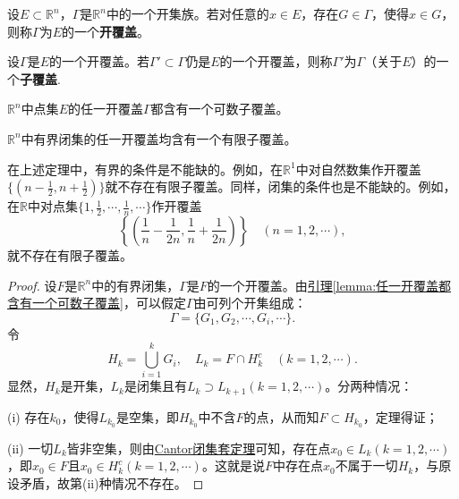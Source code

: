 \documentclass[../../main.tex]{subfiles}
\begin{document}
\begin{definition}[开覆盖]\label{definition:开覆盖}
设\(E\subset\mathbb{R}^n\)，\(\Gamma\)是\(\mathbb{R}^n\)中的一个开集族。若对任意的\(x\in E\)，存在\(G\in\Gamma\)，使得\(x\in G\)，则称\(\Gamma\)为\(E\)的一个\textbf{开覆盖}。

设\(\Gamma\)是\(E\)的一个开覆盖。若\(\Gamma'\subset\Gamma\)仍是\(E\)的一个开覆盖，则称\(\Gamma'\)为\(\Gamma\)（关于\(E\)）的一个\textbf{子覆盖}.
\end{definition}

\begin{lemma}\label{lemma:任一开覆盖都含有一个可数子覆盖}
  \(\mathbb{R}^n\)中点集\(E\)的任一开覆盖\(\Gamma\)都含有一个可数子覆盖。
\end{lemma}

\begin{theorem}\label{theorem:Heine - Borel有限子覆盖定理}
\(\mathbb{R}^n\)中有界闭集的任一开覆盖均含有一个有限子覆盖。
\end{theorem}
\begin{remark}
  在上述定理中，有界的条件是不能缺的。例如，在\(\mathbb{R}^1\)中对自然数集作开覆盖\(\{(n-\frac{1}{2},n+\frac{1}{2})\}\)就不存在有限子覆盖。同样，闭集的条件也是不能缺的。例如，在\(\mathbb{R}\)中对点集\(\{1,\frac{1}{2},\cdots,\frac{1}{n},\cdots\}\)作开覆盖
\[\left\{\left(\frac{1}{n}-\frac{1}{2n},\frac{1}{n}+\frac{1}{2n}\right)\right\}\quad(n = 1,2,\cdots),\]
就不存在有限子覆盖。
\end{remark}
\begin{proof}
  设\(F\)是\(\mathbb{R}^n\)中的有界闭集，\(\Gamma\)是\(F\)的一个开覆盖。由\hyperref[lemma:任一开覆盖都含有一个可数子覆盖]{引理\ref{lemma:任一开覆盖都含有一个可数子覆盖}}，可以假定\(\Gamma\)由可列个开集组成：
\[\Gamma=\{G_1,G_2,\cdots,G_i,\cdots\}.\]
令
\[H_k=\bigcup_{i = 1}^{k}G_i,\quad L_k = F\cap H_k^c\quad(k = 1,2,\cdots).\]
显然，\(H_k\)是开集，\(L_k\)是闭集且有\(L_k\supset L_{k + 1}(k = 1,2,\cdots)\)。分两种情况：

(i) 存在\(k_0\)，使得\(L_{k_0}\)是空集，即\(H_{k_0}\)中不含\(F\)的点，从而知\(F\subset H_{k_0}\)，定理得证；

(ii) 一切\(L_k\)皆非空集，则由\hyperref[theorem:Cantor闭集套定理]{Cantor闭集套定理}可知，存在点\(x_0\in L_k(k = 1,2,\cdots)\)，即\(x_0\in F\)且\(x_0\in H_k^c(k = 1,2,\cdots)\)。这就是说\(F\)中存在点\(x_0\)不属于一切\(H_k\)，与原设矛盾，故第(ii)种情况不存在。
\end{proof}
\end{document}
